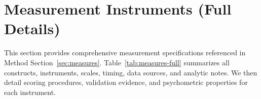 \documentclass[sigconf]{acmart}
\begin{document}
\section{Measurement Instruments (Full Details)}
\label{app:instruments}

This section provides comprehensive measurement specifications referenced in Method Section~\ref{sec:measures}. Table~\ref{tab:measures-full} summarizes all constructs, instruments, scales, timing, data sources, and analytic notes. We then detail scoring procedures, validation evidence, and psychometric properties for each instrument.

\begin{table}[h!]
  \centering
  \caption{Unified interaction/event log schema (all timestamps are monotonic, synchronized to IDE clock).}
  \label{tab:event-log}
\end{table}
\end{document}

